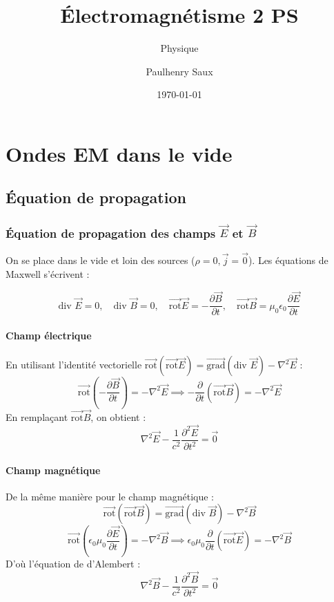 \documentclass[french]{yLectureNote}
\title{Électromagnétisme 2 PS}
\subtitle{Physique}
\author{Paulhenry Saux}
\date{\today}
\renewcommand{\vec}{\overrightarrow}
\newcommand{\lap}{\nabla^2}
\newcommand{\rot}{\vec{\mathrm{rot}}}
\newcommand{\grad}{\vec{\mathrm{grad}}}
\begin{document}
\chapter{Ondes EM dans le vide}

\section{Équation de propagation}

\subsection{Équation de propagation des champs $\vec{E}$ et $\vec{B}$}

On se place dans le vide et loin des sources ($\rho = 0, \vec{j} = \vec{0}$). Les équations de Maxwell s'écrivent :

$$\text{div } \vec{E} = 0, \quad \text{div } \vec{B} = 0, \quad \rot \vec{E} = -\frac{\partial \vec{B}}{\partial t}, \quad \rot \vec{B} = \mu_0 \epsilon_0 \frac{\partial \vec{E}}{\partial t}$$




\subsubsection{Champ électrique}
En utilisant l'identité vectorielle $\rot(\rot \vec{E}) = \grad(\text{div } \vec{E}) - \lap \vec{E}$ :
$$\rot\left(-\frac{\partial \vec{B}}{\partial t}\right) = -\lap \vec{E} \implies -\frac{\partial}{\partial t}(\rot \vec{B}) = -\lap \vec{E}$$
En remplaçant $\rot \vec{B}$, on obtient :
$$\lap \vec{E} - \frac{1}{c^2}\frac{\partial^2 \vec{E}}{\partial t^2} = \vec{0}$$

\subsubsection{Champ magnétique}
De la même manière pour le champ magnétique :
$$\rot(\rot \vec{B}) = \grad(\text{div } \vec{B}) - \lap \vec{B}$$
$$\rot\left(\epsilon_0 \mu_0 \frac{\partial \vec{E}}{\partial t}\right) = -\lap \vec{B} \implies \epsilon_0 \mu_0 \frac{\partial}{\partial t}(\rot \vec{E}) = -\lap \vec{B}$$
D'où l'équation de d'Alembert :
$$\lap \vec{B} - \frac{1}{c^2} \frac{\partial^2 \vec{B}}{\partial t^2} = \vec{0}$$
\end{document}
